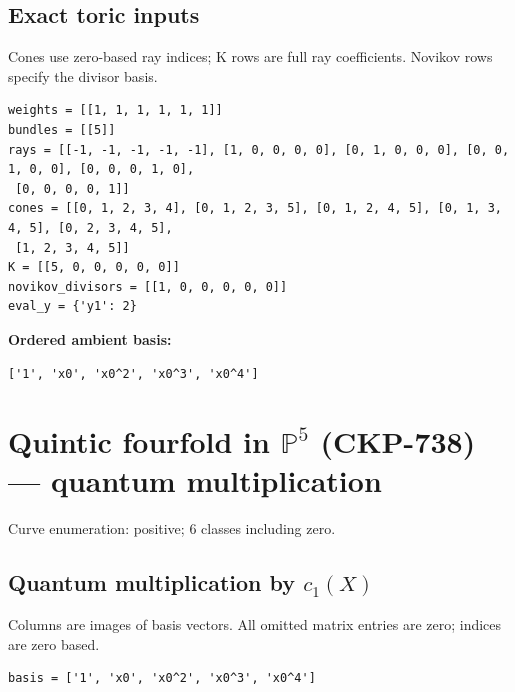 \documentclass[10pt,a4paper]{article}
\begin{document}
\subsection*{Exact toric inputs}
Cones use zero-based ray indices; K rows are full ray coefficients. Novikov rows specify the divisor basis.

\begin{lstlisting}
weights = [[1, 1, 1, 1, 1, 1]]
bundles = [[5]]
rays = [[-1, -1, -1, -1, -1], [1, 0, 0, 0, 0], [0, 1, 0, 0, 0], [0, 0, 1, 0, 0], [0, 0, 0, 1, 0],
 [0, 0, 0, 0, 1]]
cones = [[0, 1, 2, 3, 4], [0, 1, 2, 3, 5], [0, 1, 2, 4, 5], [0, 1, 3, 4, 5], [0, 2, 3, 4, 5],
 [1, 2, 3, 4, 5]]
K = [[5, 0, 0, 0, 0, 0]]
novikov_divisors = [[1, 0, 0, 0, 0, 0]]
eval_y = {'y1': 2}
\end{lstlisting}

\textbf{Ordered ambient basis:}
\begin{lstlisting}
['1', 'x0', 'x0^2', 'x0^3', 'x0^4']
\end{lstlisting}

\clearpage\section*{Quintic fourfold in $\mathbb P^{5}$ (CKP-738) --- quantum multiplication}

Curve enumeration: positive; 6 classes including zero.
\subsection*{Quantum multiplication by $c_1(X)$}
Columns are images of basis vectors. All omitted matrix entries are zero; indices are zero based.

\begin{lstlisting}
basis = ['1', 'x0', 'x0^2', 'x0^3', 'x0^4']
\end{lstlisting}
\end{document}
